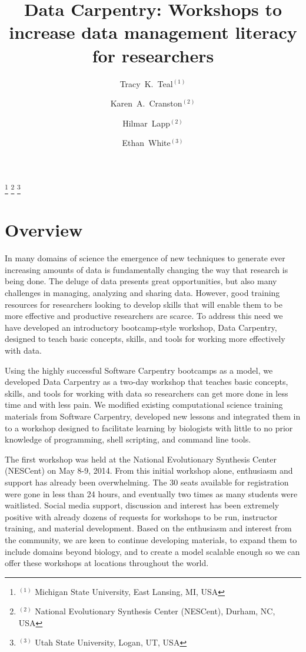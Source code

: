 \documentclass[11pt]{article}
\begin{document}
\title{Data Carpentry: Workshops to increase data management literacy for researchers}
\author{Tracy~K.~Teal$^{(1)}$ \and Karen~A.~Cranston$^{(2)}$ \and Hilmar~Lapp$^{(2)}$ \and Ethan~White$^{(3)}$}
\thanks{{}$^{(1)}$ Michigan State University, East Lansing, MI, USA}
\thanks{{}$^{(2)}$ National Evolutionary Synthesis Center (NESCent), Durham, NC, USA}
\thanks{{}$^{(3)}$ Utah State University, Logan, UT, USA}
\date{}

\maketitle

\section{Overview }
In many domains of science the emergence of new techniques to generate
ever increasing amounts of data is fundamentally changing the way that
research is being done. The deluge of data presents great
opportunities, but also many challenges in managing, analyzing and
sharing data. However, good training resources for researchers looking
to develop skills that will enable them to be more effective and
productive researchers are scarce. To address this need we have
developed an introductory bootcamp-style workshop, Data Carpentry,
designed to teach basic concepts, skills, and tools for working more
effectively with data.

Using the highly successful Software Carpentry bootcamps as a model,
we developed Data Carpentry as a two-day workshop that teaches basic
concepts, skills, and tools for working with data so researchers can
get more done in less time and with less pain. We modified existing
computational science training materials from Software Carpentry,
developed new lessons and integrated them in to a workshop designed to
facilitate learning by biologists with little to no prior knowledge of
programming, shell scripting, and command line tools.

The first workshop was held at the National Evolutionary Synthesis
Center (NESCent) on May 8-9, 2014. From this initial workshop alone,
enthusiasm and support has already been overwhelming. The 30 seats
available for registration were gone in less than 24 hours, and
eventually two times as many students were waitlisted. Social media
support, discussion and interest has been extremely positive with
already dozens of requests for workshops to be run, instructor
training, and material development. Based on the enthusiasm and
interest from the community, we are keen to continue developing
materials, to expand them to include domains beyond biology, and to
create a model scalable enough so we can offer these workshops at
locations throughout the world.
\end{document}

